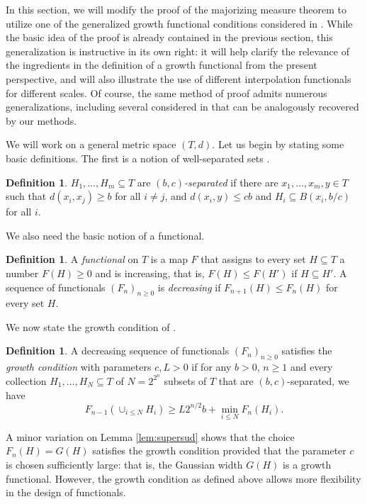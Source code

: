 \documentclass[10pt,reqno]{amsart}
\theoremstyle{definition}
\newtheorem{defn}[thm]{Definition}
\numberwithin{equation}{section}
\numberwithin{figure}{section}
\numberwithin{table}{section}
\begin{document}
In this section, we will modify the proof of the majorizing measure 
theorem to utilize one of the generalized growth functional conditions 
considered in \cite{Tal14}. While the basic idea of the proof is already 
contained in the previous section, this generalization is instructive in 
its own right: it will help clarify the relevance of the ingredients in 
the definition of a growth functional from the present perspective, and 
will also illustrate the use of different interpolation functionals for 
different scales. Of course, the same method of proof admits numerous 
generalizations, including several considered in \cite{Tal14} that can be 
analogously recovered by our methods.

We will work on a general metric space $(T,d)$. Let us begin by stating 
some basic definitions. The first is a notion of well-separated sets
\cite[Definition 2.3.8]{Tal14}.

\begin{defn}
\label{defn:sep}
$H_1,\ldots,H_m\subseteq T$ are 
\emph{$(b,c)$-separated} if there are $x_1,\ldots,x_m,y\in T$
such that $d(x_i,x_j)\ge b$ for all $i\ne j$, and
$d(x_i,y)\le cb$ and $H_i\subseteq B(x_i,b/c)$ for all $i$.
\end{defn}

We also need the basic notion of a functional.

\begin{defn}
A \emph{functional} on $T$ is a map $F$ that assigns to every set
$H\subseteq T$ a number $F(H)\ge 0$ and is increasing, that is,
$F(H)\le F(H')$ if $H\subseteq H'$. A sequence of functionals
$(F_n)_{n\ge 0}$ is \emph{decreasing} if $F_{n+1}(H)\le F_n(H)$ for 
every set $H$.
\end{defn}

We now state the growth condition of \cite[Definition 2.3.10]{Tal14}.

\begin{defn}
\label{defn:growth}
A decreasing sequence of functionals $(F_n)_{n\ge 0}$ satisfies the
\emph{growth condition} with parameters $c,L>0$ if for any $b>0$,
$n\ge 1$ and every collection
$H_1,\ldots,H_N\subseteq T$ of $N=2^{2^n}$ subsets of $T$ that
are $(b,c)$-separated, we have
$$
	F_{n-1}(\cup_{i\le N}H_i) \ge L2^{n/2}b + \min_{i\le N}
	F_n(H_i).
$$
\end{defn}

A minor variation on Lemma \ref{lem:supersud} shows that the choice 
$F_n(H)=G(H)$ satisfies the growth condition provided that the parameter 
$c$ is chosen sufficiently large: that is, the Gaussian width $G(H)$ is a 
growth functional. However, the growth condition as defined above allows 
more flexibility in the design of functionals.
\end{document}
